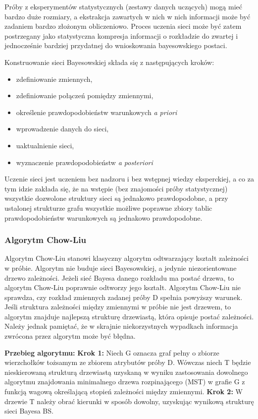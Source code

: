 Próby z eksperymentów statystycznych (zestawy danych uczących) mogą mieć bardzo duże rozmiary, a ekstrakcja zawartych w nich w nich informacji może być zadaniem bardzo złożonym obliczeniowo. Proces uczenia sieci może być zatem postrzegany jako statystyczna kompresja informacji o rozkładzie do zwartej i jednocześnie bardziej przydatnej do wnioskowania bayesowskiego postaci.

Konstruowanie sieci Bayesowskiej składa się z następujących kroków:
\begin{itemize}
\item zdefiniowanie zmiennych,
\item zdefiniowanie połączeń pomiędzy zmiennymi,
\item określenie prawdopodobieństw warunkowych \textit{a priori}
\item wprowadzenie danych do sieci,
\item uaktualnienie sieci,
\item wyznaczenie prawdopodobieństw \textit{a posteriori}
\end{itemize}

Uczenie sieci jest uczeniem bez nadzoru i bez wstępnej wiedzy eksperckiej, a co za tym idzie zakłada się, że na wstępie (bez znajomości próby statystycznej) wszystkie dozwolone struktury sieci są jednakowo prawdopodobne, a przy ustalonej strukturze grafu wszystkie możliwe poprawne zbiory tablic prawdopodobieństw warunkowych są jednakowo prawdopodobne.

\subsubsection{Algorytm Chow-Liu}
Algorytm Chow-Liu stanowi klasyczny algorytm odtwarzający kształt zależności w próbie. Algorytm nie buduje sieci Bayesowskiej, a jedynie niezorientowane drzewo zależności. Jeżeli sieć Bayesa danego rozkładu ma postać drzewa, to algorytm Chow-Liu poprawnie odtworzy jego kształt. Algorytm Chow-Liu nie sprawdza, czy rozkład zmiennych zadanej próby D spełnia powyższy warunek. Jeśli struktura zależności między zmiennymi w próbie nie jest drzewem, to algorytm znajduje najlepszą strukturę drzewiastą, która opisuje postać zależności. Należy jednak pamiętać, że w skrajnie niekorzystnych wypadkach informacja zwrócona przez algorytm może być błędna.\newline

\textbf{Przebieg algorytmu:}\newline
\textbf{Krok 1:} Niech G oznacza graf pełny o zbiorze wierzchołków tożsamym ze zbiorem atrybutów próby D. Wówczas niech T będzie nieskierowaną strukturą drzewiastą uzyskaną w wyniku zastosowania dowolnego algorytmu znajdowania minimalnego drzewa rozpinającego (MST) w grafie G z funkcją wagową określającą stopień zależności między zmiennymi.\newline
\textbf{Krok 2:} W drzewie T należy obrać kierunki w sposób dowolny, uzyskując wynikową strukturę sieci Bayesa BS.\newline


